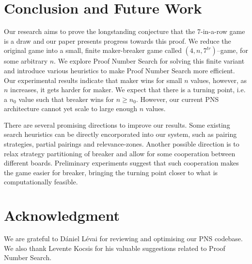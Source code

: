 \documentclass[conference]{IEEEtran}
\theoremstyle{definition}
\begin{document}
\section{Conclusion and Future Work}
Our research aims to prove the longstanding conjecture that the 7-in-a-row game is a draw and our paper presents progress towards this proof. We reduce the original game into a small, finite maker-breaker game called $(4,n,7^{tr})$--game, for some arbitrary $n$. We explore Proof Number Search for solving this finite variant and introduce various heuristics to make Proof Number Search more efficient. Our experimental results indicate that maker wins for small $n$ values, however, as $n$ increases, it gets harder for maker. We expect that there is a turning point, i.e. a $n_0$ value such that breaker wins for $n \geq n_0$. However, our current PNS architecture cannot yet scale to large enough $n$ values.

There are several promising directions to improve our results. Some existing search heuristics can be directly encorporated into our system, such as pairing strategies, partial pairings and relevance-zones. 
Another possible direction is to relax strategy partitioning of breaker and allow for some cooperation between different boards. Preliminary experiments suggest that such cooperation makes the game easier for breaker, bringing the turning point closer to what is computationally feasible.

\section*{Acknowledgment}
We are grateful to D\'{a}niel L\'{e}vai for reviewing and optimising our PNS codebase. We also thank Levente Kocsis for his valuable suggestions related to Proof Number Search.



\end{document}
